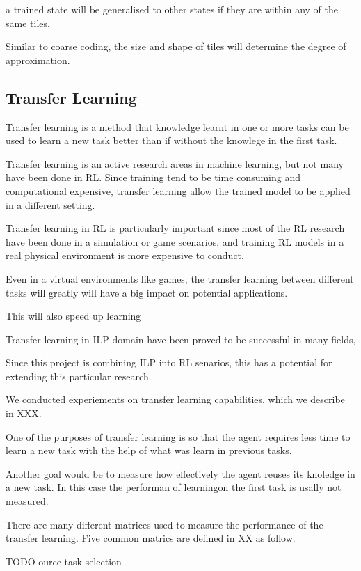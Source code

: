 \documentclass[12pt,twoside]{report}
\theoremstyle{plain}
\theoremstyle{definition}
\begin{document}
a trained state will be generalised to other states if they are within any of the same tiles. 

Similar to coarse coding, the size and shape of tiles will determine the degree of approximation. 

\subsection{Transfer Learning}
\label{transfer_learning}

Transfer learning is a method that knowledge learnt in one or more tasks can be used to learn a new task better than if without the knowlege in the first task. 

Transfer learning is an active research areas in machine learning, but not many have been done in RL. 
Since training tend to be time consuming and computational expensive, transfer learning allow the trained model to be applied in a different setting. 

Transfer learning in RL is particularly important since most of the RL research have been done in a simulation or game scenarios, and training RL models in a real physical environment is more expensive to conduct. 

Even in a virtual environments like games,  the transfer learning between different tasks will greatly will have a big impact on potential applications. 

This will also speed up learning 

Transfer learning in ILP domain have been proved to be successful in many fields, 

Since this project is combining ILP into RL senarios, this has a potential for extending this particular research. 

We conducted experiements on transfer learning capabilities, which we describe in XXX. 

One of the  purposes of transfer learning is so that the agent requires less time to learn a new task with the help of what was learn in previous tasks.  


Another goal would be to measure how effectively the agent reuses its knoledge in a new task. 
In this case the performan of learningon the first task is usally not measured. 

There are many different matrices used to measure the performance of the transfer learning.
Five common matrics are defined in XX as follow.


TODO ource task selection
\end{document}
